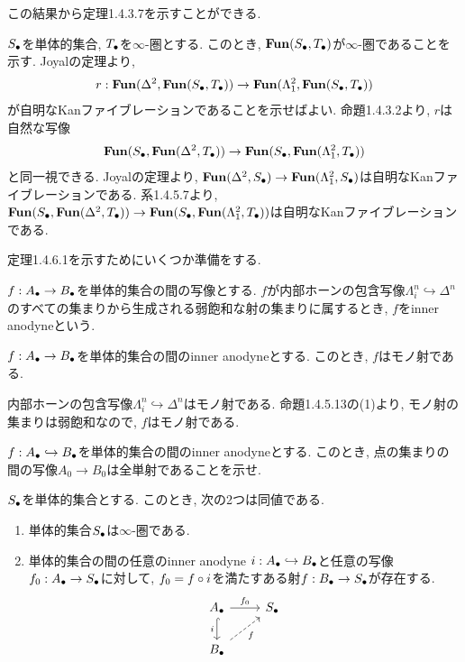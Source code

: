 \documentclass[uplatex, a4paper, 14Q, dvipdfmx]{jsreport}
\begin{document}
この結果から定理1.4.3.7を示すことができる. 

\begin{Proof}
  $\S$を単体的集合, $\T$を$\infty$-圏とする. 
  このとき, $\fun(\S,\T)$が$\infty$-圏であることを示す. 
  Joyalの定理より, 
  \begin{align*}
    r: \fun(\Delta^2,\fun(\S,\T)) \to \fun(\Lambda^2_1,\fun(\S,\T))
  \end{align*}
  が自明なKanファイブレーションであることを示せばよい.
  命題1.4.3.2より, $r$は自然な写像
  \begin{align*}
    \fun(\S,\fun(\Delta^2,\T)) \to \fun(\S,\fun(\Lambda^2_1,\T))
  \end{align*}
  と同一視できる. 
  Joyalの定理より, $\fun(\Delta^2,\S) \to \fun(\Lambda^2_1,\S)$は自明なKanファイブレーションである.
  系1.4.5.7より, $\fun(\S,\fun(\Delta^2,\T)) \to \fun(\S,\fun(\Lambda^2_1,\T))$は自明なKanファイブレーションである. 
\end{Proof}

定理1.4.6.1を示すためにいくつか準備をする. 

\begin{definition}
  $f: \A \to \B$を単体的集合の間の写像とする. 
  $f$が内部ホーンの包含写像$\Lambda^n_i \hookrightarrow \Delta^n$のすべての集まりから生成される弱飽和な射の集まりに属するとき, $f$をinner anodyneという. 
\end{definition}

\begin{remark}
  $f: \A \to \B$を単体的集合の間のinner anodyneとする.
  このとき, $f$はモノ射である.  
\end{remark}

\begin{Proof}
  内部ホーンの包含写像$\Lambda^n_i \hookrightarrow \Delta^n$はモノ射である. 
  命題1.4.5.13の(1)より, モノ射の集まりは弱飽和なので, $f$はモノ射である.  
\end{Proof}

\begin{exe}
  $f: \A \hookrightarrow \B$を単体的集合の間のinner anodyneとする.
  このとき, 点の集まりの間の写像$A_0 \to B_0$は全単射であることを示せ. 
\end{exe}

\begin{prop}
  $\S$を単体的集合とする. 
  このとき, 次の2つは同値である. 
  \begin{enumerate}
    \item 単体的集合$\S$は$\infty$-圏である. 
    \item 単体的集合の間の任意のinner anodyne $i: \A \hookrightarrow \B$と任意の写像$f_0: \A \to \S$に対して, 
    $f_0=f \ci i$を満たすある射$f: \B \to \S$が存在する.
    \[\begin{tikzcd}
      \A & \S \\
      \B
      \arrow["{f_0}", from=1-1, to=1-2]
      \arrow["i"', hook, from=1-1, to=2-1]
      \arrow["f"', dashed, from=2-1, to=1-2]
    \end{tikzcd}\]
  \end{enumerate}
\end{prop}
\end{document}
